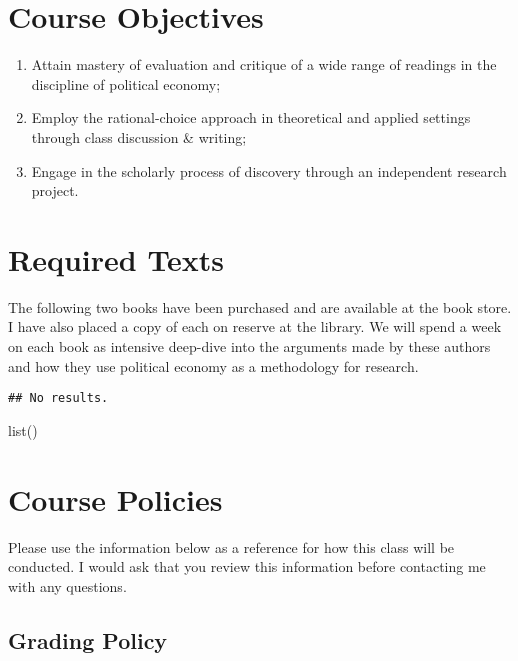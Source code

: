 \documentclass[11pt,]{article}
\begin{document}
\hypertarget{course-objectives}{%
\section{Course Objectives}\label{course-objectives}}

\begin{enumerate}
\def\labelenumi{\arabic{enumi}.}
\item
  Attain mastery of evaluation and critique of a wide range of readings
  in the discipline of political economy;
\item
  Employ the rational-choice approach in theoretical and applied
  settings through class discussion \& writing;
\item
  Engage in the scholarly process of discovery through an independent
  research project.
\end{enumerate}

\hypertarget{required-texts}{%
\section{Required Texts}\label{required-texts}}

The following two books have been purchased and are available at the
book store. I have also placed a copy of each on reserve at the library.
We will spend a week on each book as intensive deep-dive into the
arguments made by these authors and how they use political economy as a
methodology for research.

\begin{verbatim}
## No results.
\end{verbatim}

list()

\hypertarget{course-policies}{%
\section{Course Policies}\label{course-policies}}

Please use the information below as a reference for how this class will
be conducted. I would ask that you review this information before
contacting me with any questions.

\hypertarget{grading-policy}{%
\subsection{Grading Policy}\label{grading-policy}}
\end{document}
